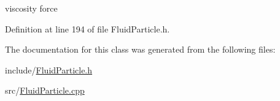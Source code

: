 viscosity force 



Definition at line 194 of file FluidParticle.h.



The documentation for this class was generated from the following files:\begin{DoxyCompactItemize}
\item 
include/\hyperlink{_fluid_particle_8h}{FluidParticle.h}\item 
src/\hyperlink{_fluid_particle_8cpp}{FluidParticle.cpp}\end{DoxyCompactItemize}
